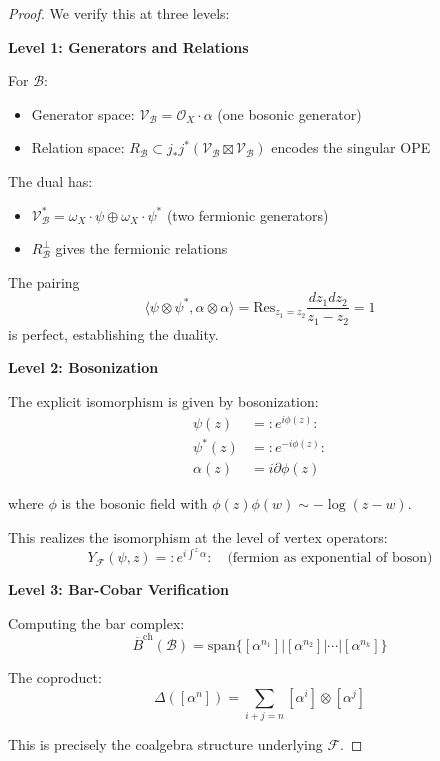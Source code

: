 \begin{proof}
We verify this at three levels:

\textbf{Level 1: Generators and Relations}

For $\mathcal{B}$:
\begin{itemize}
\item Generator space: $\mathcal{V}_{\mathcal{B}} = \mathcal{O}_X \cdot \alpha$ (one bosonic generator)
\item Relation space: $R_{\mathcal{B}} \subset j_*j^*(\mathcal{V}_{\mathcal{B}} \boxtimes \mathcal{V}_{\mathcal{B}})$ encodes the singular OPE
\end{itemize}

The dual has:
\begin{itemize}
\item $\mathcal{V}_{\mathcal{B}}^* = \omega_X \cdot \psi \oplus \omega_X \cdot \psi^*$ (two fermionic generators)
\item $R_{\mathcal{B}}^{\perp}$ gives the fermionic relations
\end{itemize}

The pairing 
\[
\langle \psi \otimes \psi^*, \alpha \otimes \alpha \rangle = \text{Res}_{z_1=z_2} \frac{dz_1 dz_2}{z_1-z_2} = 1
\]
is perfect, establishing the duality.

\textbf{Level 2: Bosonization}

The explicit isomorphism is given by bosonization:
\begin{align}
\psi(z) &= :e^{i\phi(z)}: \\
\psi^*(z) &= :e^{-i\phi(z)}: \\
\alpha(z) &= i\partial\phi(z)
\end{align}

where $\phi$ is the bosonic field with $\phi(z)\phi(w) \sim -\log(z-w)$.

This realizes the isomorphism at the level of vertex operators:
\[
Y_{\mathcal{F}}(\psi, z) = :e^{i\int^z \alpha}: \quad \text{(fermion as exponential of boson)}
\]

\textbf{Level 3: Bar-Cobar Verification}

Computing the bar complex:
\[
\overline{B}^{\text{ch}}(\mathcal{B}) = \text{span}\{[\alpha^{n_1}]|[\alpha^{n_2}]|\cdots|[\alpha^{n_k}]\}
\]

The coproduct:
\[
\Delta([\alpha^n]) = \sum_{i+j=n} [\alpha^i] \otimes [\alpha^j]
\]

This is precisely the coalgebra structure underlying $\mathcal{F}$.
\end{proof}

